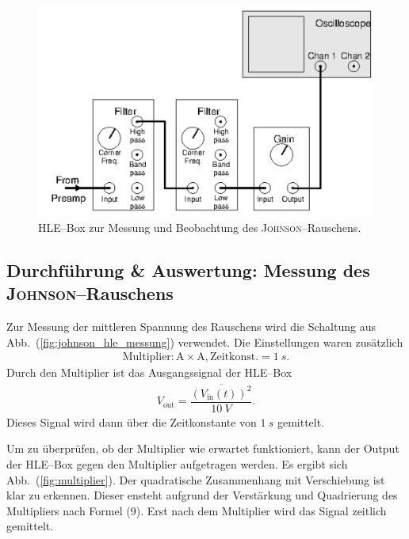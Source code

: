 \documentclass[sn-mathphys-num,iicol]{sn-jnl}
\theoremstyle{thmstyleone}
\theoremstyle{thmstyletwo}
\theoremstyle{thmstylethree}
\begin{document}
\begin{figure}[t]
	\centering
	\includegraphics[width=.5\textwidth]{425_schaltplan_visualisierung_johnson_HLE.png}
	\caption{HLE--Box zur Messung und Beobachtung des \textsc{Johnson}--Rauschens.\cite{anleitung425}} \label{fig:johnson_hle}
\end{figure}

\subsection{Durchführung \& Auswertung: Messung des \textsc{Johnson}--Rauschens}
Zur Messung der mittleren Spannung des Rauschens wird die Schaltung aus Abb.\ (\ref{fig:johnson_hle_messung}) verwendet.
Die Einstellungen waren zusätzlich
\begin{align}
	\text{Multiplier}:\text{A}\times \text{A},\text{Zeitkonst.}=\SI{1}{s}
	.\end{align}
Durch den Multiplier ist das Ausgangssignal der HLE--Box
\begin{align}
	V_\text{out}=\dfrac{\overline{\left(V_\text{in}(t)\right)^2}}{\SI{10}{V}}
	.\end{align}
Dieses Signal wird dann über die Zeitkonstante von $\SI{1}{s}$ gemittelt.

Um zu überprüfen, ob der Multiplier wie erwartet funktioniert, kann der Output der HLE--Box gegen den Multiplier aufgetragen werden.
Es ergibt sich Abb.\ (\ref{fig:multiplier}).
Der quadratische Zusammenhang mit Verschiebung ist klar zu erkennen. Dieser ensteht aufgrund der Verstärkung und Quadrierung des Multipliers nach Formel (9). Erst nach dem Multiplier wird das Signal zeitlich gemittelt.%
\end{document}

